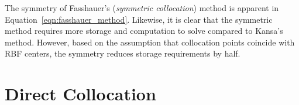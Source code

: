 \documentclass{report}
\begin{document}
{The symmetry of Fasshauer's (\emph{symmetric collocation}) method is apparent in Equation~\ref{eqn:fasshauer_method}. Likewise, it is clear that the symmetric method requires more storage and computation to solve compared to Kansa's method. However, based on the assumption that collocation points coincide with RBF centers, the symmetry reduces storage requirements by half. 
 
 
\section{Direct Collocation}

}
\end{document}
